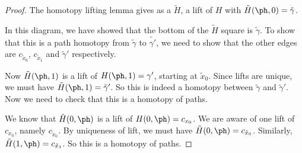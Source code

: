 \documentclass[a4paper]{article}
\begin{document}
\begin{proof}
  The homotopy lifting lemma gives as a $\tilde{H}$, a lift of $H$ with $\tilde{H}(\ph, 0) = \tilde{\gamma}$.
  \begin{center}
  \end{center}
  In this diagram, we have showed that the bottom of the $\tilde{H}$ square is $\tilde{\gamma}$. To show that this is a path homotopy from $\tilde{\gamma}$ to $\tilde{\gamma'}$, we need to show that the other edges are $c_{\tilde{x}_0}$, $c_{\tilde{x}_1}$ and $\tilde{\gamma}'$ respectively.


  Now $\tilde{H}(\ph, 1)$ is a lift of $H(\ph, 1) = \gamma'$, starting at $\tilde{x}_0$. Since lifts are unique, we must have $\tilde{H}(\ph, 1) = \tilde{\gamma}'$. So this is indeed a homotopy between $\tilde{\gamma}$ and $\tilde{\gamma}'$. Now we need to check that this is a homotopy of paths.

  We know that $\tilde{H}(0, \ph)$ is a lift of $H(0, \ph) = c_{x_0}$. We are aware of one lift of $c_{x_0}$, namely $c_{\tilde{x}_0}$. By uniqueness of lift, we must have $\tilde{H}(0, \ph) = c_{\tilde{x}_0}$. Similarly, $\tilde{H}(1, \ph) = c_{\tilde{x}_1}$. So this is a homotopy of paths.
\end{proof}
\end{document}
